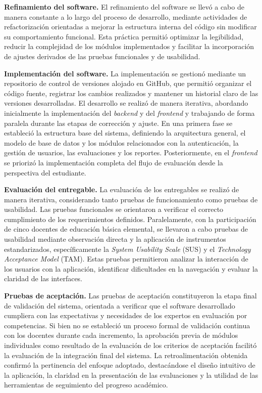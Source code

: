 \textbf{Refinamiento del software.} El refinamiento del software se llevó a cabo de manera constante a lo largo del proceso de desarrollo, mediante actividades de refactorización orientadas a mejorar la estructura interna del código sin modificar su comportamiento funcional. Esta práctica permitió optimizar la legibilidad, reducir la complejidad de los módulos implementados y facilitar la incorporación de ajustes derivados de las pruebas funcionales y de usabilidad.

\textbf{Implementación del software.} La implementación se gestionó mediante un repositorio de control de versiones alojado en GitHub, que permitió organizar el código fuente, registrar los cambios realizados y mantener un historial claro de las versiones desarrolladas. El desarrollo se realizó de manera iterativa, abordando inicialmente la implementación del \textit{backend} y del \textit{frontend} y trabajando de forma paralela durante las etapas de corrección y ajuste. En una primera fase se estableció la estructura base del sistema, definiendo la arquitectura general, el modelo de base de datos y los módulos relacionados con la autenticación, la gestión de usuarios, las evaluaciones y los reportes. Posteriormente, en el \textit{frontend} se priorizó la implementación completa del flujo de evaluación desde la perspectiva del estudiante.

\textbf{Evaluación del entregable.} La evaluación de los entregables se realizó de manera iterativa, considerando tanto pruebas de funcionamiento como pruebas de usabilidad. Las pruebas funcionales se orientaron a verificar el correcto cumplimiento de los requerimientos definidos. Paralelamente, con la participación de cinco docentes de educación básica elemental, se llevaron a cabo pruebas de usabilidad mediante observación directa y la aplicación de instrumentos estandarizados, específicamente la \textit{System Usability Scale} (SUS) y el \textit{Technology Acceptance Model} (TAM). Estas pruebas permitieron analizar la interacción de los usuarios con la aplicación, identificar dificultades en la navegación y evaluar la claridad de las interfaces.

\textbf{Pruebas de aceptación.} Las pruebas de aceptación constituyeron la etapa final de validación del sistema, orientada a verificar que el software desarrollado cumpliera con las expectativas y necesidades de los expertos en evaluación por competencias. Si bien no se estableció un proceso formal de validación continua con los docentes durante cada incremento, la aprobación previa de módulos individuales como resultado de la evaluación de los criterios de aceptación facilitó la evaluación de la integración final del sistema. La retroalimentación obtenida confirmó la pertinencia del enfoque adoptado, destacándose el diseño intuitivo de la aplicación, la claridad en la presentación de las evaluaciones y la utilidad de las herramientas de seguimiento del progreso académico.

